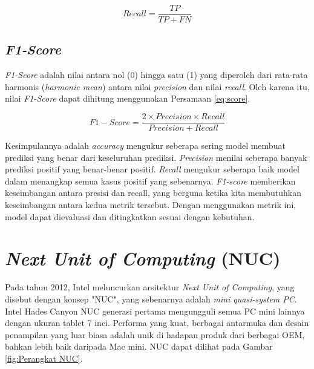 \begin{equation}
  \label{eq:recall}
  Recall=\frac{TP}{TP+FN}
\end{equation}

\subsection{\emph{F1-Score}}
\label{subsec:score_klasifikasi}

\emph{F1-Score} adalah nilai antara nol (0) hingga satu (1) yang diperoleh dari rata-rata harmonis (\emph{harmonic mean}) antara nilai \emph{precision} dan nilai \emph{recall}. Oleh karena itu, nilai \emph{F1-Score} dapat dihitung menggunakan Persamaan \ref{eq:score}.

\begin{equation}
  \label{eq:score}
  F{1}{-}Score=\frac{2 \times Precision \times Recall}{Precision+Recall}
\end{equation}

Kesimpulannya adalah \emph{accuracy} mengukur seberapa sering model membuat prediksi yang benar dari keseluruhan prediksi. \emph{Precision} menilai seberapa banyak prediksi positif yang benar-benar positif. \emph{Recall} mengukur seberapa baik model dalam menangkap semua kasus positif yang sebenarnya. \emph{F1-score} memberikan keseimbangan antara presisi dan recall, yang berguna ketika kita membutuhkan keseimbangan antara kedua metrik tersebut. Dengan menggunakan metrik ini, model dapat dievaluasi dan ditingkatkan sesuai dengan kebutuhan.

\section{\textit{Next Unit of Computing} (NUC)}

Pada tahun 2012, Intel meluncurkan arsitektur \textit{Next Unit of Computing}, yang disebut dengan konsep "NUC", yang sebenarnya adalah \textit{mini quasi-system PC}. Intel Hades Canyon NUC generasi pertama mengungguli semua PC mini lainnya dengan ukuran tablet 7 inci. Performa yang kuat, berbagai antarmuka dan desain penampilan yang luar biasa adalah unik di hadapan produk dari berbagai OEM, bahkan lebih baik daripada Mac mini\parencite{8858650}. NUC dapat dilihat pada Gambar \ref{fig:Perangkat NUC}.

